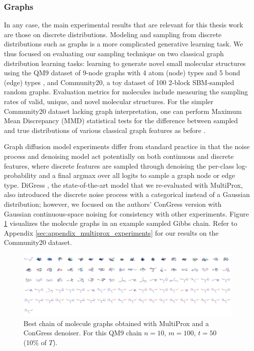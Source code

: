 \subsubsection{Graphs}
In any case, the main experimental results that are relevant for this thesis work are those on discrete distributions. Modeling and sampling from discrete distributions such as graphs is a more complicated generative learning task. We thus focused on evaluating our sampling technique on two classical graph distribution learning tasks: learning to generate novel small molecular structures using the QM9 dataset of 9-node graphs with 4 atom (node) types and 5 bond (edge) types \cite{ruddigkeit_enumeration_2012, ramakrishnan_quantum_2014}, and Community20, a toy dataset of 100 2-block SBM-sampled random graphs. Evaluation metrics for molecules include measuring the sampling rates of valid, unique, and novel molecular structures. For the simpler Community20 dataset lacking graph interpretation, one can perform Maximum Mean Discrepancy (MMD) statistical tests for the difference between sampled and true distributions of various classical graph features as before \cite{gretton_kernel_2012, liao_efficient_2019}.

Graph diffusion model experiments differ from standard practice in that the noise process and denoising model act potentially on both continuous and discrete features, where discrete features are sampled through denoising the per-class log-probability and a final argmax over all logits to sample a graph node or edge type. DiGress \cite{vignac_digress_2022}, the state-of-the-art model that we re-evaluated with MultiProx, also introduced the discrete noise process with a categorical instead of a Gaussian distribution; however, we focused on the authors' ConGress version with Gaussian continuous-space noising for consistency with other experiments. Figure \ref{fig:multiprox_qm9} visualizes the molecule graphs in an example sampled Gibbs chain. Refer to Appendix \ref{sec:appendix_multiprox_experiments} for our results on the Community20 dataset. 

\begin{figure}[H]
    \centering
    \includegraphics[width=\linewidth]{figures/multiprox/qm9_grid_image_single_noise.png}
    \caption[Best chain of molecule graphs obtained with MultiProx and a ConGress denoiser.]{Best chain of molecule graphs obtained with MultiProx and a ConGress denoiser. For this QM9 chain $n=10$, $m=100$, $t=50$ (10\% of $T$).
    }
    \label{fig:multiprox_qm9}
\end{figure}

